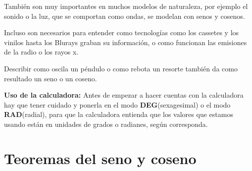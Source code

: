 \documentclass[a4paper,11pt,spanish,sans]{exam}
\begin{document}
También son muy importantes en muchos modelos de naturaleza, por ejemplo el sonido o la luz, que se comportan como ondas, se modelan con senos y cosenos.

Incluso son necesarios para entender como tecnologías como los cassetes y los vinilos hasta los Blurays graban su información, o como funcionan las emisiones de la radio o los rayos x.

Describir como oscila un péndulo o como rebota un resorte también da como resultado un seno o un coseno.

\textbf{Uso de la calculadora:} Antes de empezar a hacer cuentas con la calculadora hay que tener cuidado y ponerla en el modo \textbf{DEG}(sexagesimal) o el modo \textbf{RAD}(radial), para que la calculadora entienda que los valores que estamos usando  están en unidades de grados o radianes, según corresponda.\\

\section*{Teoremas del seno y coseno}
\end{document}
